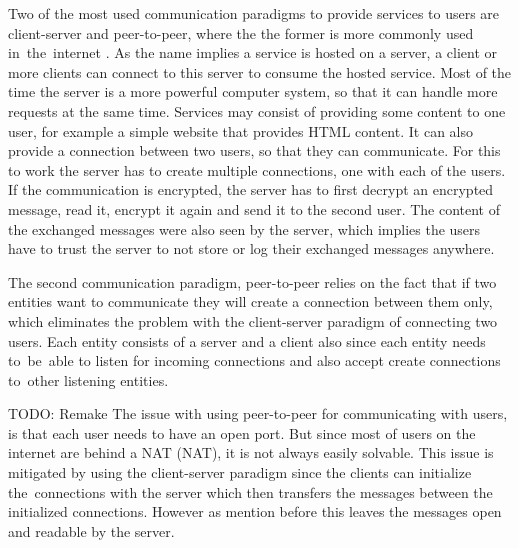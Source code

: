 Two of the most used communication paradigms to provide services to users are client-server and peer-to-peer, where the the former is more commonly used in~the~internet \cite{Forouzan2010}. As the name implies a service is hosted on a server, a client or more clients can connect to this server to consume the hosted service. Most of the time the server is a more powerful computer system, so that it can handle more requests at the same time. Services may consist of providing some content to one user, for example a simple website that provides HTML content. It can also provide a connection between two users, so that they can communicate. For this to work the server has to create multiple connections, one with each of the users. If the communication is encrypted, the server has to first decrypt an encrypted message, read it, encrypt it again and send it to the second user. The content of the exchanged messages were also seen by the server, which implies the users have to trust the server to not store or log their exchanged messages anywhere.

The second communication paradigm, peer-to-peer relies on the fact that if two entities want to communicate they will create a connection between them only, which eliminates the problem with the client-server paradigm of connecting two users. Each entity consists of a server and a client also since each entity needs to~be~able to listen for incoming connections and also accept create connections to~other listening entities.

TODO: Remake
The issue with using peer-to-peer for communicating with users, is that each user needs to have an open port. But since most of users on the internet are behind a NAT (\acl{NAT}), it is not always easily solvable. This issue is mitigated by using the client-server paradigm since the clients can initialize the~connections with the server which then transfers the messages between the initialized connections. However as mention before this leaves the messages open and readable by the server. 
